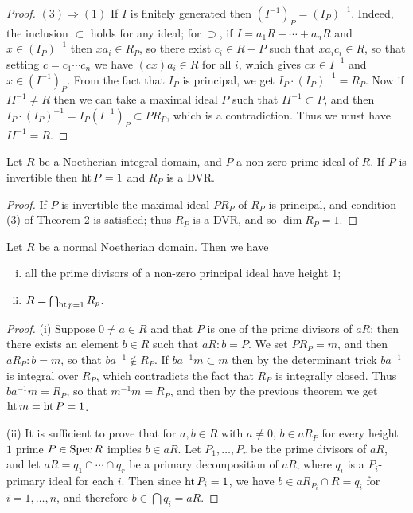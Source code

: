 \begin{proof}
$(3) \Rightarrow (1)$ If $I$ is finitely generated then $(I^{-1})_P = (I_P)^{-1}$. Indeed, the
inclusion $\subset$ holds for any ideal; for $\supset$, if $I = a_1R + \cdots + a_nR$ and $x \in (I_P)^{-1}$
then $xa_i \in R_P$, so there exist $c_i \in R - P$ such that $xa_ic_i \in R$, so that setting
$c = c_1 \cdots c_n$ we have $(cx)a_i \in R$ for all $i$, which gives $cx \in I^{-1}$ and $x \in (I^{-1})_P$.
From the fact that $I_P$ is principal, we get $I_P \cdot (I_P)^{-1} = R_P$. Now if $II^{-1} \neq R$
then we can take a maximal ideal $P$ such that $II^{-1} \subset P$, and then
$I_P \cdot (I_P)^{-1} = I_P(I^{-1})_P \subset PR_P$, which is a contradiction. Thus we must have
$II^{-1} = R$.
\end{proof}

\begin{theorem}\label{thm:11.4}
Let $R$ be a Noetherian integral domain, and $P$ a non-zero
prime ideal of $R$. If $P$ is invertible then $\operatorname{ht} P = 1$ and $R_P$ is a DVR.
\end{theorem}

\begin{proof}
If $P$ is invertible the maximal ideal $PR_P$ of $R_P$ is principal, and
condition (3) of Theorem 2 is satisfied; thus $R_P$ is a DVR, and so $\dim R_P = 1$.
\end{proof}

\begin{theorem}\label{thm:11.5}
Let $R$ be a normal Noetherian domain. Then we have
\begin{enumerate}[(i)]
  \item all the prime divisors of a non-zero principal ideal have height $1$;
  \item $R = \bigcap_{\operatorname{ht} p = 1} R_p$.
\end{enumerate}
\end{theorem}

\begin{proof}
(i) Suppose $0 \neq a \in R$ and that $P$ is one of the prime divisors of $aR$;
then there exists an element $b \in R$ such that $aR:b = P$. We set $PR_P = m$, and
then $aR_P:b = m$, so that $ba^{-1} \notin R_P$.
If $ba^{-1}m \subset m$ then by the determinant trick $ba^{-1}$ is integral over $R_P$, which
contradicts the fact that $R_P$ is integrally closed. Thus $ba^{-1}m = R_P$, so that $m^{-1}m = R_P$, and
then by the previous theorem we get $\operatorname{ht} m = \operatorname{ht} P = 1$.

(ii) It is sufficient to prove that for $a, b \in R$ with $a \neq 0$, $b \in aR_P$ for every
height $1$ prime $P \in \operatorname{Spec} R$ implies $b \in aR$. Let $P_1, \ldots, P_r$ be the prime
divisors of $aR$, and let $aR = q_1 \cap \cdots \cap q_r$ be a primary decomposition of
$aR$, where $q_i$ is a $P_i$-primary ideal for each $i$. Then since $\operatorname{ht} P_i = 1$, we have
$b \in aR_{P_i} \cap R = q_i$ for $i = 1, \ldots, n$, and therefore $b \in \bigcap q_i = aR$.
\end{proof}

